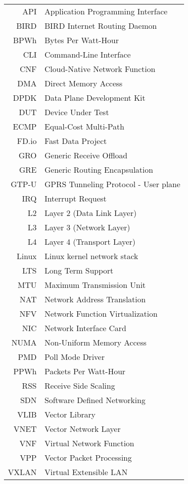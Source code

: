 \documentclass[english,bachelor,unicode,oneside]{ctufit-thesis}
\begin{document}
\begin{tabular}{rl}
API & Application Programming Interface\\
BIRD & BIRD Internet Routing Daemon\\
BPWh & Bytes Per Watt-Hour\\
CLI & Command-Line Interface\\
CNF & Cloud-Native Network Function\\
DMA & Direct Memory Access\\
DPDK & Data Plane Development Kit\\
DUT & Device Under Test\\
ECMP & Equal-Cost Multi-Path\\
FD.io & Fast Data Project\\
GRO & Generic Receive Offload\\
GRE & Generic Routing Encapsulation\\
GTP-U & GPRS Tunneling Protocol - User plane\\
IRQ & Interrupt Request\\
L2 & Layer 2 (Data Link Layer)\\
L3 & Layer 3 (Network Layer)\\
L4 & Layer 4 (Transport Layer)\\
Linux & Linux kernel network stack\\
LTS & Long Term Support\\
MTU & Maximum Transmission Unit\\
NAT & Network Address Translation\\
NFV & Network Function Virtualization\\
NIC & Network Interface Card\\
NUMA & Non-Uniform Memory Access\\
PMD & Poll Mode Driver\\
PPWh & Packets Per Watt-Hour\\
RSS & Receive Side Scaling\\
SDN & Software Defined Networking\\
VLIB & Vector Library\\
VNET & Vector Network Layer\\
VNF & Virtual Network Function\\
VPP & Vector Packet Processing\\
VXLAN & Virtual Extensible LAN\\
\end{tabular}

\resumeTOCentries
\mainmatter\mainmatterinit %
\end{document}
